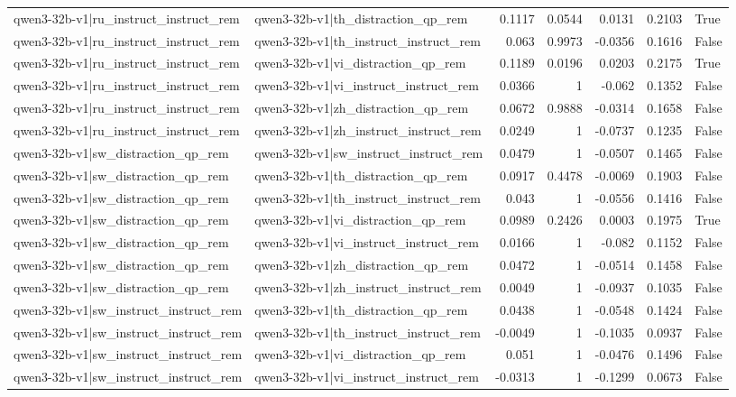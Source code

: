 \begin{table}
\begin{tabular}{l l r r r r l}
qwen3-32b-v1|ru_instruct_instruct_rem & qwen3-32b-v1|th_distraction_qp_rem & 0.1117 & 0.0544 & 0.0131 & 0.2103 & True \\
qwen3-32b-v1|ru_instruct_instruct_rem & qwen3-32b-v1|th_instruct_instruct_rem & 0.063 & 0.9973 & -0.0356 & 0.1616 & False \\
qwen3-32b-v1|ru_instruct_instruct_rem & qwen3-32b-v1|vi_distraction_qp_rem & 0.1189 & 0.0196 & 0.0203 & 0.2175 & True \\
qwen3-32b-v1|ru_instruct_instruct_rem & qwen3-32b-v1|vi_instruct_instruct_rem & 0.0366 & 1 & -0.062 & 0.1352 & False \\
qwen3-32b-v1|ru_instruct_instruct_rem & qwen3-32b-v1|zh_distraction_qp_rem & 0.0672 & 0.9888 & -0.0314 & 0.1658 & False \\
qwen3-32b-v1|ru_instruct_instruct_rem & qwen3-32b-v1|zh_instruct_instruct_rem & 0.0249 & 1 & -0.0737 & 0.1235 & False \\
qwen3-32b-v1|sw_distraction_qp_rem & qwen3-32b-v1|sw_instruct_instruct_rem & 0.0479 & 1 & -0.0507 & 0.1465 & False \\
qwen3-32b-v1|sw_distraction_qp_rem & qwen3-32b-v1|th_distraction_qp_rem & 0.0917 & 0.4478 & -0.0069 & 0.1903 & False \\
qwen3-32b-v1|sw_distraction_qp_rem & qwen3-32b-v1|th_instruct_instruct_rem & 0.043 & 1 & -0.0556 & 0.1416 & False \\
qwen3-32b-v1|sw_distraction_qp_rem & qwen3-32b-v1|vi_distraction_qp_rem & 0.0989 & 0.2426 & 0.0003 & 0.1975 & True \\
qwen3-32b-v1|sw_distraction_qp_rem & qwen3-32b-v1|vi_instruct_instruct_rem & 0.0166 & 1 & -0.082 & 0.1152 & False \\
qwen3-32b-v1|sw_distraction_qp_rem & qwen3-32b-v1|zh_distraction_qp_rem & 0.0472 & 1 & -0.0514 & 0.1458 & False \\
qwen3-32b-v1|sw_distraction_qp_rem & qwen3-32b-v1|zh_instruct_instruct_rem & 0.0049 & 1 & -0.0937 & 0.1035 & False \\
qwen3-32b-v1|sw_instruct_instruct_rem & qwen3-32b-v1|th_distraction_qp_rem & 0.0438 & 1 & -0.0548 & 0.1424 & False \\
qwen3-32b-v1|sw_instruct_instruct_rem & qwen3-32b-v1|th_instruct_instruct_rem & -0.0049 & 1 & -0.1035 & 0.0937 & False \\
qwen3-32b-v1|sw_instruct_instruct_rem & qwen3-32b-v1|vi_distraction_qp_rem & 0.051 & 1 & -0.0476 & 0.1496 & False \\
qwen3-32b-v1|sw_instruct_instruct_rem & qwen3-32b-v1|vi_instruct_instruct_rem & -0.0313 & 1 & -0.1299 & 0.0673 & False \\

\end{tabular}
\end{table}
